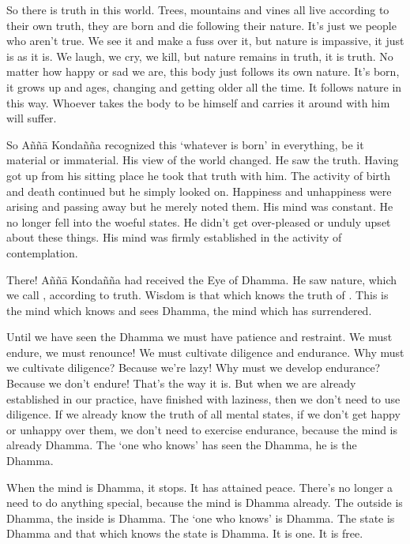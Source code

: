 So there is truth in this world. Trees, mountains and vines all live according to their own truth, they are born and die following their nature. It's just we people who aren't true. We see it and make a fuss over it, but nature is impassive, it just is as it is. We laugh, we cry, we kill, but nature remains in truth, it is truth. No matter how happy or sad we are, this body just follows its own nature. It's born, it grows up and ages, changing and getting older all the time. It follows nature in this way. Whoever takes the body to be himself and carries it around with him will suffer.

So A\~n\~n\=a Konda\~n\~na recognized this `whatever is born' in everything, be it material or immaterial. His view of the world changed. He saw the truth. Having got up from his sitting place he took that truth with him. The activity of birth and death continued but he simply looked on. Happiness and unhappiness were arising and passing away but he merely noted them. His mind was constant. He no longer fell into the woeful states. He didn't get over-pleased or unduly upset about these things. His mind was firmly established in the activity of contemplation.

There! A\~n\~n\=a Konda\~n\~na had received the Eye of Dhamma. He saw nature, which we call , according to truth. Wisdom is that which knows the truth of . This is the mind which knows and sees Dhamma, the mind which has surrendered.

Until we have seen the Dhamma we must have patience and restraint. We must endure, we must renounce! We must cultivate diligence and endurance. Why must we cultivate diligence? Because we're lazy! Why must we develop endurance? Because we don't endure! That's the way it is. But when we are already established in our practice, have finished with laziness, then we don't need to use diligence. If we already know the truth of all mental states, if we don't get happy or unhappy over them, we don't need to exercise endurance, because the mind is already Dhamma. The `one who knows' has seen the Dhamma, he is the Dhamma.

When the mind is Dhamma, it stops. It has attained peace. There's no longer a need to do anything special, because the mind is Dhamma already. The outside is Dhamma, the inside is Dhamma. The `one who knows' is Dhamma. The state is Dhamma and that which knows the state is Dhamma. It is one. It is free.

